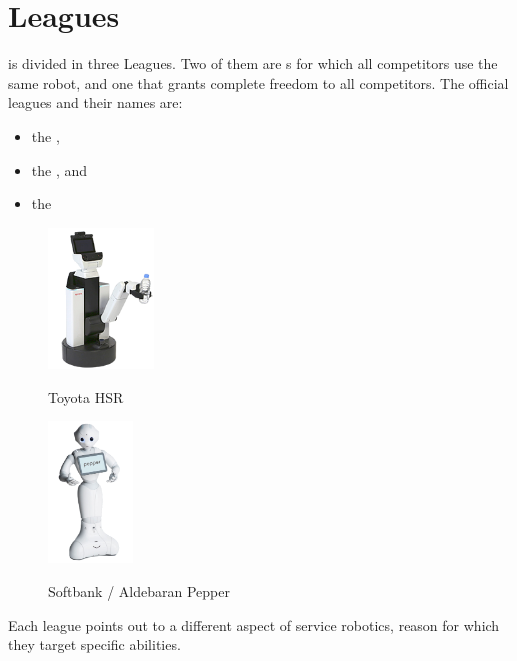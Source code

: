 \section{Leagues}
\label{sec:leagues}

 is divided in three Leagues. Two of them are s for which all competitors use the same robot, and one that grants complete freedom to all competitors. The official leagues and their names are:
\begin{itemize}
  \item the ,
  \item the , and
  \item the 
\end{itemize}

\begin{figure}
	\centering
	\vspace{-30pt}
	\includegraphics[width=0.25\textwidth]{images/toyota_hsr.png}
	\vspace{-10pt}
	\label{fig:toyotaHSR}
	\caption{Toyota HSR}
	\includegraphics[width=0.20\textwidth]{images/softbank_pepper.png}
	\vspace{-10pt}
	\label{fig:softbank-pepper}
	\caption{Softbank / Aldebaran Pepper}
\end{figure}
Each league points out to a different aspect of service robotics, reason for which they target specific abilities.


